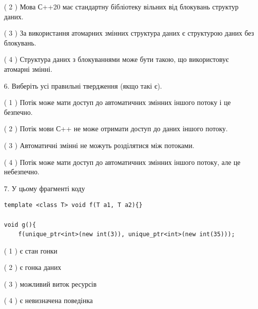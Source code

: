 \documentclass[12pt, ukrainian]{article}
\begin{document}
\begin {large}
{( 2 ) Мова С++20 має стандартну бібліотеку вільних від блокувань структур даних.%

( 3 ) За використання атомарних змінних структура даних є структурою даних без блокувань.%

( 4 ) Структура даних з блокуваннями може бути такою, що використовує атомарні змінні.%
\newpage



\vspace{5mm}
6. Виберіть усі правильні твердження (якщо такі є).\par
\vspace{2mm}

( 1 ) Потік може мати доступ до автоматичних змінних іншого потоку і це безпечно.%

( 2 ) Потік мови С++ не може отримати доступ до даних іншого потоку.%

( 3 ) Автоматичні змінні не можуть розділятися між потоками.%

( 4 ) Потік може мати доступ до автоматичних змінних іншого потоку, але це небезпечно.%


\vspace{5mm}
7. У цьому фрагменті коду
\begin{verbatim}
template <class T> void f(T a1, T a2){}

void g(){
    f(unique_ptr<int>(new int(3)), unique_ptr<int>(new int(35)));
\end{verbatim}

( 1 ) є стан гонки%

( 2 ) є гонка даних%

( 3 ) можливий виток ресурсів%

( 4 ) є невизначена поведінка%
}
\end {large}
\end{document}
